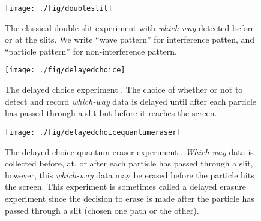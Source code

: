 \documentclass[11pt]{article}
\theoremstyle{definition}
\begin{document}
\begin{figure}[h!]
	\begin{center}
			\texttt{[image: ./fig/doubleslit]}
		\caption{The classical double slit experiment \cite{feynmanvol3, aspect1987wave} with \emph{which-way} detected  before or at the slits. We write ``wave pattern'' for interference patten, and ``particle pattern'' for non-interference pattern. }\label{figdoubleslit}
	\end{center}
\end{figure}
 \begin{figure}[h!]
	\begin{center}
			\texttt{[image: ./fig/delayedchoice]}
		\caption{The delayed choice experiment \cite{wheeler1978past, jacques2007experimental}. The choice of whether or not to detect and record \emph{which-way} data is delayed until after each particle has passed through a slit but before it reaches the screen.}\label{figdelayedchoice}
	\end{center}
\end{figure}
 \begin{figure}[h!]
	\begin{center}
			\texttt{[image: ./fig/delayedchoicequantumeraser]}
		\caption{The delayed choice quantum eraser experiment \cite{scully1982quantum, kim2000delayed}. \emph{Which-way} data is collected before, at, or after each particle has passed through a slit, however, this \emph{which-way} data may be erased before the particle hits the screen.   This experiment is sometimes called a delayed erasure experiment since the decision to erase is made after the particle has passed through a slit (chosen one path or the other).}\label{figdelayedchoicequantumeraser}
	\end{center}
\end{figure}
\end{document}
